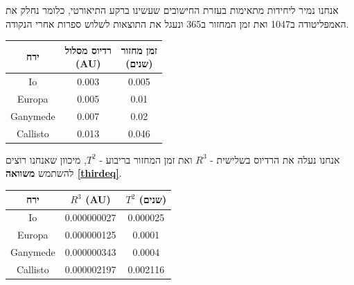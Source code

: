 \documentclass[a4paper, 12pt]{article}
\begin{document}
    \vspace{10pt}

    \begin{flushright}
        אנחנו נמיר ליחידות מתאימות בעזרת החישובים שעשינו ברקע התיאורטי, כלומר
        נחלק את האמפליטודה ב1047 ואת זמן המחזור ב365 ונעגל את התוצאות
        לשלוש ספרות אחרי הנקודה.
    \end{flushright}

    \begin{table}[h!]
        \centering
        \setlength{\tabcolsep}{10pt} %
        \begin{tabular}{ c c c }
            ירח & \makecell{רדיוס מסלול \\ (AU)} & \makecell{זמן מחזור \\ (שנים)} \\
            \hline
            Io & 0.003 & 0.005 \\
            Europa & 0.005 & 0.01 \\ 
            Ganymede & 0.007 & 0.02 \\
            Callisto & 0.013 & 0.046 \\
        \end{tabular}
    \end{table}

    \vspace{10pt}

    \begin{flushright}
        אנחנו נעלה את הרדיוס בשלישית - $R^3$ ואת זמן המחזור בריבוע - $T^2$, מיכוון שאנחנו
        רוצים להשתמש \textbf{משוואה \ref{thirdeq}}.
    \end{flushright}

    \begin{table}[h!]
        \centering
        \setlength{\tabcolsep}{10pt} %
        \begin{tabular}{ c c c }
            ירח & \textenglish{$R^3$ (AU)} & \textenglish{{$T^2$} (שנים)} \\
            \hline
            Io & 0.000000027 & 0.000025 \\
            Europa & 0.000000125 & 0.0001 \\ 
            Ganymede & 0.000000343 & 0.0004 \\
            Callisto & 0.000002197 & 0.002116 \\
        \end{tabular}
    \end{table}
\end{document}
